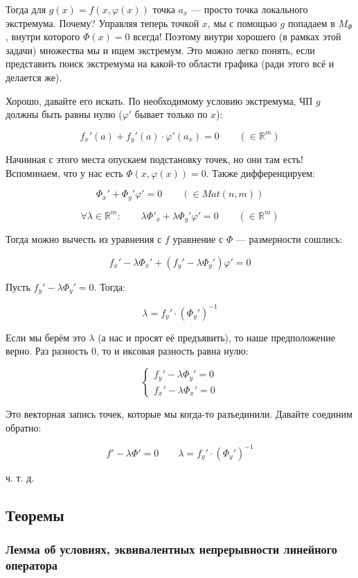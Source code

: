 \documentclass{article}
\begin{document}
Тогда для $g(x) = f(x, \varphi(x))$ точка $a_x$ --- просто точка локального экстремума. Почему? Управляя теперь точкой $x$, мы с помощью $g$ попадаем в $M_\Phi$, внутри которого $\Phi(x) = 0$ всегда! Поэтому внутри хорошего (в рамках этой задачи) множества мы и ищем экстремум. Это можно легко понять, если представить поиск экстремума на какой-то области графика (ради этого всё и делается же).

Хорошо, давайте его искать. По необходимому условию экстремума, ЧП $g$ должны быть равны нулю ($\varphi'$ бывает только по $x$):

\[f_x'(a) + f_y'(a)\cdot\varphi'(a_x) = 0 \qquad (\in \mathbb{R}^m)\]

Начииная с этого места опускаем подстановку точек, но они там есть! Вспоминаем, что у нас есть $\Phi(x, \varphi(x)) = 0$. Также дифференцируем: 

\[\Phi_x' + \Phi_y'\varphi' = 0 \qquad (\in Mat(n, m))\]

\[\forall \lambda \in \mathbb{R}^m: \qquad \lambda\Phi'_x + \lambda\Phi_y'\varphi' = 0 \qquad (\in \mathbb{R}^m)\]

Тогда можно вычесть из уравнения с $f$ уравнение с $\Phi$ --- размерности сошлись:

\[f_x' - \lambda\Phi_x' + (f_y' - \lambda\Phi_y')\varphi' = 0\]

Пусть $f_y' - \lambda\Phi_y' = 0$. Тогда:

\[\lambda = f_y' \cdot \left(\Phi_y'\right)^{-1}\]

Если мы берём это $\lambda$ (а нас и просят её предъявить), то наше предположение верно. Раз разность 0, то и иксовая разность равна нулю:

\[\begin{cases}
    f_y' - \lambda\Phi_y' = 0\\
    f_x' - \lambda\Phi_x' = 0
\end{cases}\]

Это векторная запись точек, которые мы когда-то разъединили. Давайте соединим обратно: 

\[f' - \lambda\Phi' = 0 \qquad \lambda = f_y' \cdot \left(\Phi_y'\right)^{-1}\]

ч. т. д. 

\newpage

\subsection{Теоремы}

\subsubsection{Лемма об условиях, эквивалентных непрерывности линейного оператора}
\end{document}
